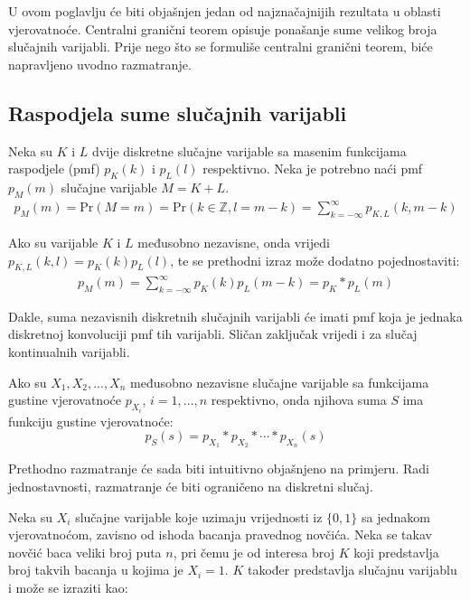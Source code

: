 U ovom poglavlju će biti objašnjen jedan od najznačajnijih rezultata u oblasti
vjerovatnoće. Centralni granični teorem opisuje ponašanje sume velikog broja
slučajnih varijabli. Prije nego što se formuliše centralni granični teorem, biće
napravljeno uvodno razmatranje.

\subsection{Raspodjela sume slučajnih varijabli}

Neka su $K$ i $L$ dvije diskretne slučajne varijable sa masenim funkcijama
raspodjele (pmf) $p_K(k)$ i $p_L(l)$ respektivno. Neka je potrebno naći pmf
$p_M(m)$ slučajne varijable $M=K+L$.
%
\newcommand{\pr}{\text{Pr}}
\begin{align*}
  p_M(m) = \pr(M=m) = \pr(k\in\mathbb{Z}, l=m-k)
  = \sum_{k=-\infty}^{\infty} p_{K,L}(k,m-k)
\end{align*}

Ako su varijable $K$ i $L$ međusobno nezavisne, onda vrijedi $p_{K,L}(k,l) =
p_K(k)p_L(l)$, te se prethodni izraz može dodatno pojednostaviti:
%
\begin{align*}
  p_M(m) = \sum_{k=-\infty}^{\infty} p_K(k)p_L(m-k) = p_K * p_L (m)
\end{align*}

Dakle, suma nezavisnih diskretnih slučajnih varijabli će imati pmf koja je
jednaka diskretnoj konvoluciji pmf tih varijabli. Sličan zaključak vrijedi i za
slučaj kontinualnih varijabli.

\begin{theorem} %

  Ako su $X_1,X_2,...,X_n$ međusobno nezavisne slučajne varijable sa funkcijama
  gustine vjerovatnoće $p_{X_i}$, $i=1,...,n$ respektivno, onda njihova suma $S$
  ima funkciju gustine vjerovatnoće:
  $$p_S(s) = p_{X_1} * p_{X_2} * \cdots * p_{X_n} (s)$$

\end{theorem}

Prethodno razmatranje će sada biti intuitivno objašnjeno na primjeru.  Radi
jednostavnosti, razmatranje će biti ograničeno na diskretni slučaj.

Neka su $X_i$ slučajne varijable koje uzimaju vrijednosti iz $\{0,1\}$ sa
jednakom vjerovatnoćom, zavisno od ishoda bacanja pravednog novčića. Neka se
takav novčić baca veliki broj puta $n$, pri čemu je od interesa broj $K$ koji
predstavlja broj takvih bacanja u kojima je $X_i=1$. $K$ također predstavlja
slučajnu varijablu i može se izraziti kao: %

